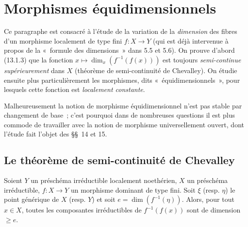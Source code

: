 \section{Morphismes équidimensionnels}
\label{section:IV.13-fr}

Ce paragraphe est consacré à l'étude de la variation de la \emph{dimension}
des fibres d'un morphisme localement de type fini $f:X\to Y$ (qui est déjà
intervenue à propos de la «~formule des dimensions~» dans 5.5 et 5.6). On
prouve d'abord (13.1.3) que la fonction
$x\mapsto\dim_x(f^{-1}(f(x)))$ est toujours \emph{semi-continue
supérieurement} dans $X$ (théorème de semi-continuité de Chevalley). On étudie
ensuite plus particulièrement les morphismes, dits «~équidimensionnels~», pour
lesquels cette fonction est \emph{localement constante}.

Malheureusement la notion de morphisme équidimensionnel n'est pas stable par
changement de base~; c'est pourquoi dans de nombreuses questions il est plus
commode de travailler avec la notion de morphisme universellement ouvert, dont
l'étude fait l'objet des \S\S~14 et 15.

\subsection{Le théorème de semi-continuité de Chevalley}
\label{subsection:IV.13.1-fr}

\begin{lemma}[13.1.1]
\label{IV.13.1.1-fr}
Soient $Y$ un préschéma irréductible localement noethérien, $X$ un préschéma
irréductible, $f:X\to Y$ un morphisme dominant de type fini. Soit $\xi$
(resp. $\eta$) le point générique de $X$ (resp. $Y$) et soit
$e=\dim(f^{-1}(\eta))$. Alors, pour tout $x\in X$, toutes les composantes
irréductibles de $f^{-1}(f(x))$ sont de dimension $\geq e$.
\end{lemma}

